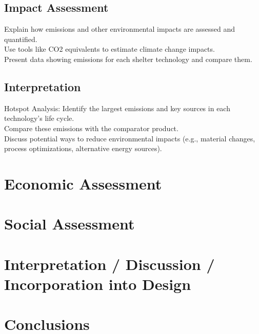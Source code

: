 \documentclass{article}
\begin{document}
\subsection{Impact Assessment}
Explain how emissions and other environmental impacts are assessed and quantified.\\
Use tools like CO2 equivalents to estimate climate change impacts.\\
Present data showing emissions for each shelter technology and compare them.
\subsection{Interpretation}
Hotspot Analysis: Identify the largest emissions and key sources in each technology’s life cycle.\\
Compare these emissions with the comparator product.\\
Discuss potential ways to reduce environmental impacts (e.g., material changes, process optimizations, alternative energy sources).

\newpage

\section{Economic Assessment}

\newpage

\section{Social Assessment}

\newpage

\section{Interpretation / Discussion / Incorporation into Design}

\newpage

\section{Conclusions}

\newpage
\end{document}
